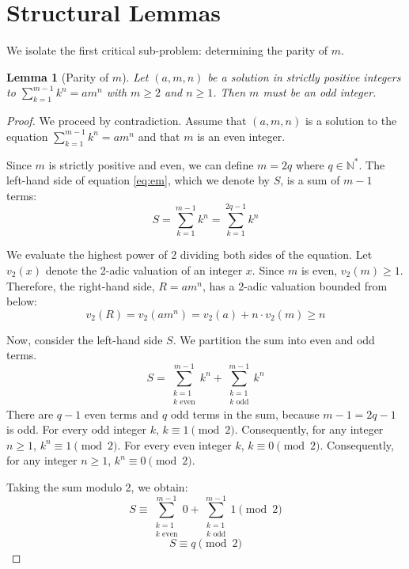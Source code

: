 \documentclass[11pt,a4paper]{article}
\newtheorem{lemma}{Lemma}
\begin{document}
\section{Structural Lemmas}

We isolate the first critical sub-problem: determining the parity of $m$.

\begin{lemma}[Parity of $m$]
\label{lem:parity}
Let $(a, m, n)$ be a solution in strictly positive integers to $\sum_{k=1}^{m-1} k^n = a m^n$ with $m \ge 2$ and $n \ge 1$. Then $m$ must be an odd integer.
\end{lemma}

\begin{proof}
We proceed by contradiction. Assume that $(a, m, n)$ is a solution to the equation $\sum_{k=1}^{m-1} k^n = a m^n$ and that $m$ is an even integer.

Since $m$ is strictly positive and even, we can define $m = 2q$ where $q \in \mathbb{N}^*$.
The left-hand side of equation \eqref{eq:em}, which we denote by $S$, is a sum of $m-1$ terms:
\begin{equation}
S = \sum_{k=1}^{m-1} k^n = \sum_{k=1}^{2q-1} k^n
\end{equation}

We evaluate the highest power of 2 dividing both sides of the equation.
Let $v_2(x)$ denote the 2-adic valuation of an integer $x$.
Since $m$ is even, $v_2(m) \ge 1$. Therefore, the right-hand side, $R = a m^n$, has a 2-adic valuation bounded from below:
\begin{equation}
v_2(R) = v_2(a m^n) = v_2(a) + n \cdot v_2(m) \ge n
\end{equation}

Now, consider the left-hand side $S$. We partition the sum into even and odd terms.
\begin{equation}
S = \sum_{\substack{k=1 \\ k \text{ even}}}^{m-1} k^n + \sum_{\substack{k=1 \\ k \text{ odd}}}^{m-1} k^n
\end{equation}
There are $q-1$ even terms and $q$ odd terms in the sum, because $m-1 = 2q-1$ is odd.
For every odd integer $k$, $k \equiv 1 \pmod 2$. Consequently, for any integer $n \ge 1$, $k^n \equiv 1 \pmod 2$.
For every even integer $k$, $k \equiv 0 \pmod 2$. Consequently, for any integer $n \ge 1$, $k^n \equiv 0 \pmod 2$.

Taking the sum modulo 2, we obtain:
\begin{equation}
S \equiv \sum_{\substack{k=1 \\ k \text{ even}}}^{m-1} 0 + \sum_{\substack{k=1 \\ k \text{ odd}}}^{m-1} 1 \pmod 2
\end{equation}
\begin{equation}
S \equiv q \pmod 2
\end{equation}


\end{proof}
\end{document}
